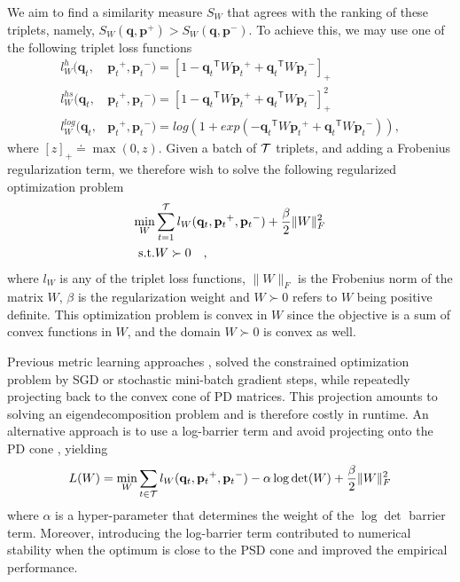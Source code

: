 \documentclass{article} %
\newcommand\mat[1]{{#1}}
\renewcommand\vec[1]{\mathbf{#1}}
\newcommand{\T}{{}^\mathsf{T}}
\newcommand{\W}{\mat{W}}
\newcommand{\eqdef}{\doteq}
\newcommand{\frobsq}[1]{{\|#1\|_F^2}}
\newcommand{\frob}[1]{{\|#1\|_F}}
\newcommand{\q}{{\vec{q}}}
\newcommand{\p}{{\vec{p}}}
\newcommand{\trip}{{t}}
\newcommand{\qt}{{\q_{\trip}}}
\newcommand{\pt}{{\p_{\trip}}}
\begin{document}
We aim to find a similarity measure $S_{\W}$ that agrees with the ranking of these triplets, namely, $S_{\W}(\q, \p^{+}) > S_{\W}(\q,
\p^{-})$. To achieve this, we may use one of the following triplet loss functions
\begin{align}
\label{single-triplet-lossed}
l_{\W}^h(\qt, &\pt^{+}, \pt^{-}) = [1-\qt\T\W\pt^+ + \qt\T\W\pt^-]_{+}
 \\ \nonumber
l_{\W}^{hs}(\qt, &\pt^+, \pt^-) = [1-\qt\T\W\pt^+ + \qt\T\W\pt^-]_{+}^2
 \\ \nonumber
l_{\W}^{log}(\qt, &\pt^+, \pt^-) = log(1+exp(-\qt\T\W\pt^+ + \qt\T\W\pt^-)) \nonumber ,
\end{align}
where $[z]_{+} \eqdef \max(0,z)$. Given a batch of $\cal{T}$ triplets, and adding a Frobenius regularization term, we therefore wish to solve the following regularized optimization problem
\begin{eqnarray}
  \min_{\W}& \sum_{\trip=1}^{\cal{T}}  l_{\W}(\qt, \pt^+, \pt^-) + \frac{\beta}{2} \frobsq{\W}
 \\  \nonumber
   \rm{s.t.}& \W \succ 0 \quad,
\label{hingelt}
\end{eqnarray}
where $l_{\W}$ is any of the triplet loss functions, $\frob{\W}$ is the Frobenius norm of the matrix $\W$, $\beta$ is the regularization weight and $\W \succ 0$ refers to $\W$ being positive definite. This optimization problem is convex in $\W$ since the objective is a sum of convex functions in $\W$, and the domain $\W \succ 0$ is convex as well.

Previous metric learning approaches \cite{OASIS, qianHD, qian}, solved the constrained optimization problem by SGD or stochastic mini-batch gradient steps, while repeatedly projecting back to the convex cone of PD matrices. This projection amounts to solving an eigendecomposition problem and is therefore costly in runtime. An alternative approach is to use a log-barrier term and avoid projecting onto the PD cone \cite{davis2007information,lego}, yielding
\begin{equation}
\label{eq-logdet-loss}
L(W) = 
  \min_{\W} \sum_{\trip \in \cal{T}}  l_{\W}(\qt, \pt^+, \pt^-) - \alpha \log \det(\W) + \frac{\beta}{2} \frobsq{\W}
\end{equation}
where $\alpha$ is a hyper-parameter that determines the weight of the
$\log \det$ barrier term. Moreover, introducing the log-barrier term contributed to numerical stability when the optimum is close to the PSD cone and improved the empirical performance.
\end{document}
